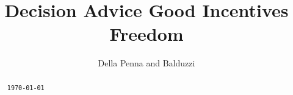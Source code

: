 



\title{Decision Advice Good Incentives Freedom}

\author{Della Penna and Balduzzi}

\begin{abstract}%
  \begin{center}
    \texttt{\today}
  \end{center}
\end{abstract}

\maketitle





{


}


